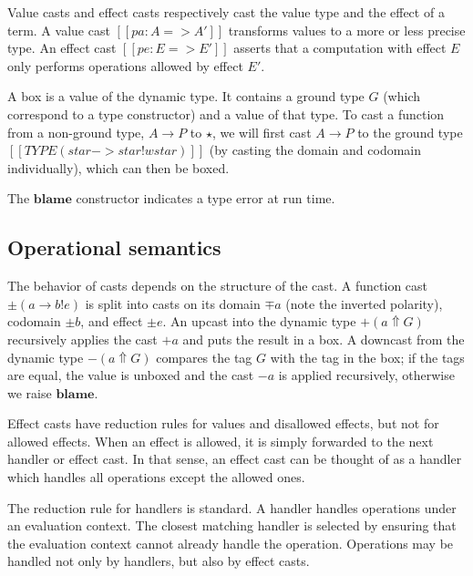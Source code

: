 Value casts and effect casts respectively cast the value type and the effect of a term.
A value cast $[[pa : A => A']]$ transforms values to a more or less precise type.
An effect cast $[[pe : E => E']]$ asserts that a computation with effect $E$
only performs operations allowed by effect $E'$.

A box is a value of the dynamic type. It contains a ground type $G$
(which correspond to a type constructor) and a value of that type.
To cast a function from a non-ground type, $A \to P$ to $\star$,
we will first cast $A \to P$ to the ground type
$[[TYPE ( star -> star ! wstar )]]$ (by casting the domain and codomain individually),
which can then be boxed.

The $\mathbf{blame}$ constructor indicates a type error at run time.

\subsection{Operational semantics}

The behavior of casts depends on the structure of the cast.
A function cast $\pm (a \to b ! e)$
is split into casts on its domain $\mp a$ (note the inverted polarity), codomain $\pm b$, and effect $\pm e$.
An upcast into the dynamic type $+ (a \Uparrow G)$
recursively applies the cast $+ a$ and puts the result in a box.
A downcast from the dynamic type $- (a \Uparrow G)$ compares
the tag $G$ with the tag in the box; if the tags are equal, the value is
unboxed and the cast $- a$ is applied recursively,
otherwise we raise $\mathbf{blame}$.

Effect casts have reduction rules for values and disallowed effects,
but not for allowed effects. When an effect is allowed, it is simply
forwarded to the next handler or effect cast. In that sense,
an effect cast can be thought of as a handler which handles all operations
except the allowed ones.

The reduction rule for handlers is standard. A handler handles operations under an
evaluation context. The closest matching handler is selected by ensuring that
the evaluation context cannot already handle the operation.
Operations may be handled not only by handlers, but also by effect casts.



